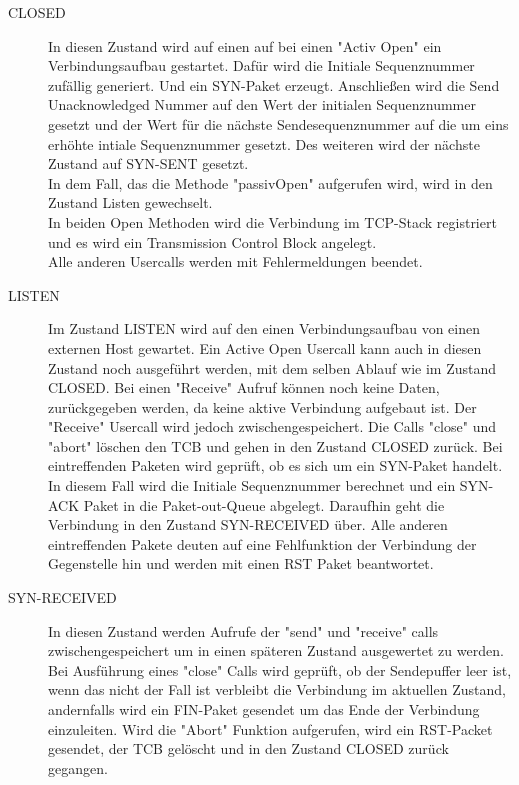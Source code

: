 \begin{description}
\item[CLOSED]
In diesen Zustand wird auf einen auf bei einen "{}Activ Open"{} ein Verbindungsaufbau gestartet. Dafür wird die Initiale Sequenznummer zufällig generiert. Und ein SYN-Paket erzeugt. Anschließen wird die Send Unacknowledged Nummer auf den Wert der initialen Sequenznummer gesetzt und der Wert für die nächste Sendesequenznummer auf die um eins erhöhte intiale Sequenznummer gesetzt. Des weiteren wird der nächste Zustand auf SYN-SENT gesetzt. \\
In dem Fall, das die Methode {}"passivOpen"{} aufgerufen wird, wird in den Zustand Listen gewechselt. \\
In beiden Open Methoden wird die Verbindung im TCP-Stack registriert und es wird ein Transmission Control Block angelegt.\\
Alle anderen Usercalls werden mit Fehlermeldungen beendet. 

\item[LISTEN]
Im Zustand LISTEN wird auf den einen Verbindungsaufbau von einen externen Host gewartet. Ein Active Open Usercall kann auch in diesen Zustand noch ausgeführt werden, mit dem selben Ablauf wie im Zustand CLOSED. Bei einen "Receive" Aufruf können noch keine Daten, zurückgegeben werden, da keine aktive Verbindung aufgebaut ist. Der "Receive" Usercall wird jedoch zwischengespeichert. 
Die Calls "{}close"{} und "{}abort"{} löschen den TCB und gehen in den Zustand CLOSED zurück.
Bei eintreffenden Paketen wird geprüft, ob es sich um ein SYN-Paket handelt. In diesem Fall wird die Initiale Sequenznummer berechnet und ein SYN-ACK Paket in die Paket-out-Queue abgelegt. Daraufhin geht die Verbindung in den Zustand SYN-RECEIVED über. Alle anderen eintreffenden Pakete deuten auf eine Fehlfunktion der Verbindung der Gegenstelle hin und werden mit einen RST Paket beantwortet. 


\item[SYN-RECEIVED]
In diesen Zustand werden Aufrufe der {}"send"{} und {}"receive"{} calls zwischengespeichert um in einen späteren Zustand ausgewertet zu werden. 
Bei Ausführung eines {}"close"{} Calls wird geprüft, ob der Sendepuffer leer ist, wenn das nicht der Fall ist verbleibt die Verbindung im aktuellen Zustand, andernfalls wird ein FIN-Paket gesendet um das Ende der Verbindung einzuleiten. 
Wird die "{}Abort"{} Funktion aufgerufen, wird ein RST-Packet gesendet, der TCB gelöscht und in den Zustand CLOSED zurück gegangen.\\ 


\end{description}
